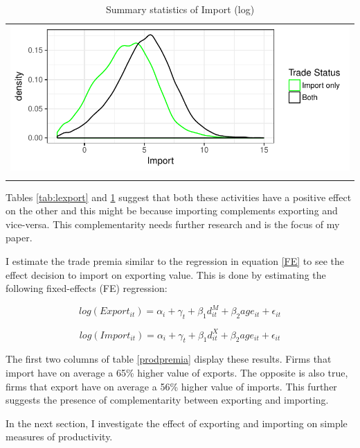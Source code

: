 \documentclass[12pt]{article}
\begin{document}
\begin{center}
\begin{table}[H]
\caption{Summary statistics of Import (log)}
\label{tab:limport}
\begin{tabular}{c}
 \includegraphics{./PICS/denslimport.pdf}   \\ 
   \\  
\end{tabular}
\end{table}
\end{center}

Tables \ref{tab:lexport} and \ref{tab:limport} suggest that both these activities have a
positive effect on the other and this might be because importing
complements exporting and vice-versa. This complementarity needs
further research and is the focus of my paper. 

I estimate the trade premia similar to the regression in equation
\ref{FE} to see the effect decision to import on exporting value. This is done by estimating the
following fixed-effects (FE) regression:

$$  log(Export_{it}) = \alpha_{i} + \gamma_{t} +  \beta_{1} d_{it}^{M}
+ \beta_{2} age_{it} + \epsilon_{it}$$

$$  log(Import_{it}) = \alpha_{i} + \gamma_{t} + \beta_{1} d_{it}^{X} + \beta_{2} age_{it} + \epsilon_{it}$$ 

\begin{center}

\end{center}

The first two columns of table \ref{prodpremia} display these
results. Firms that  import have on average  a 65\%  higher value of exports. The
opposite is also true, firms that export have on average a 56\% higher
value of imports.  This further suggests the presence of complementarity
between exporting and importing. 

In the next section, I investigate the effect of exporting and importing on
simple measures of productivity.
 
\end{document}

